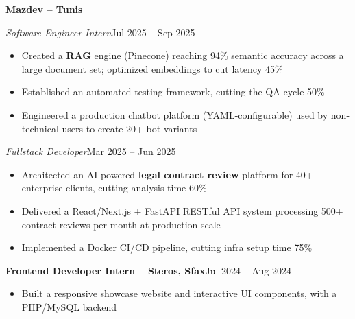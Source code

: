 \documentclass[10pt,a4paper]{article}
\newcommand{\entry}[2]{\vspace{1pt}\noindent\textbf{#1}\hfill{\color{muted}#2}\par}
\newcommand{\subentry}[2]{\noindent\textit{#1}\hfill{\color{muted}#2}\par}
\begin{document}
\entry{Mazdev -- Tunis}{}
\subentry{Software Engineer Intern}{Jul 2025 -- Sep 2025}
\begin{itemize}
  \item Created a \textbf{RAG} engine (Pinecone) reaching 94\% semantic accuracy across a large document set; optimized embeddings to cut latency 45\%
  \item Established an automated testing framework, cutting the QA cycle 50\%
  \item Engineered a production chatbot platform (YAML-configurable) used by non-technical users to create 20+ bot variants
\end{itemize}
\subentry{Fullstack Developer}{Mar 2025 -- Jun 2025}
\begin{itemize}
  \item Architected an AI-powered \textbf{legal contract review} platform for 40+ enterprise clients, cutting analysis time 60\%
  \item Delivered a React/Next.js + FastAPI RESTful API system processing 500+ contract reviews per month at production scale
  \item Implemented a Docker CI/CD pipeline, cutting infra setup time 75\%
\end{itemize}

\entry{Frontend Developer Intern -- Steros, Sfax}{Jul 2024 -- Aug 2024}
\begin{itemize}
  \item Built a responsive showcase website and interactive UI components, with a PHP/MySQL backend
\end{itemize}
\end{document}
